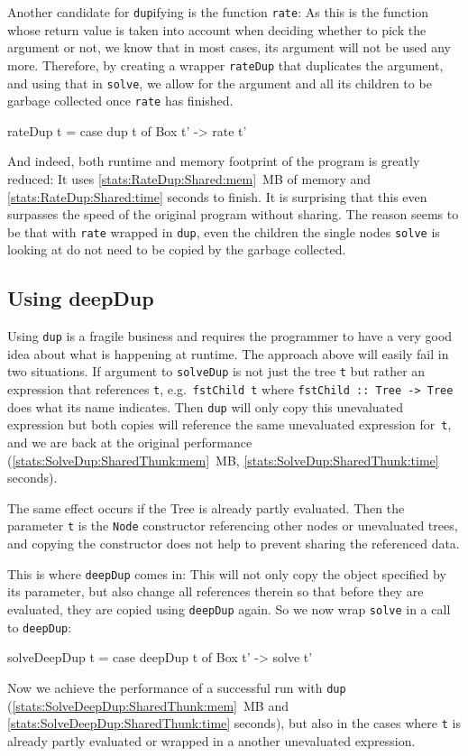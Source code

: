 \documentclass[preprint]{sigplanconf}
\theoremstyle{nonumberplain}
\newcommand{\li}{\lstinline[style=Haskell]}
\begin{document}
Another candidate for \li-dup-ifying is the function \li-rate-:
As this is the function whose return value is taken into account when deciding whether to pick the argument or not, we know that in most cases, its argument will not be used any more. Therefore, by creating a wrapper \li-rateDup- that duplicates the argument, and using that in \li-solve-, we allow for the argument and all its children to be garbage collected once \li-rate- has finished.

\begin{haskell}
rateDup t = case dup t of Box t' -> rate t'
\end{haskell}
And indeed, both runtime and memory footprint of the program is greatly reduced: It uses \ref{stats:RateDup:Shared:mem}~MB of memory and \ref{stats:RateDup:Shared:time} seconds to finish. It is surprising that this even surpasses the speed of the original program without sharing. The reason seems to be  that with \li-rate- wrapped in \li-dup-, even the children the single nodes \li-solve- is looking at do not need to be copied by the garbage collected.

\subsection{Using deepDup}

\label{sec:deepdup}
Using \li-dup- is a fragile business and requires the programmer to have a very good idea about what is happening at runtime. The approach above will easily fail in two situations. If argument to \li-solveDup- is not just the tree \li-t- but rather an expression that references \li-t-, e.g.\ \li-fstChild t- where \li!fstChild :: Tree -> Tree! does what its name indicates. Then \li-dup- will only copy this unevaluated expression but both copies will reference the same unevaluated expression for~\li-t-, and we are back at the original performance (\ref{stats:SolveDup:SharedThunk:mem}~MB, \ref{stats:SolveDup:SharedThunk:time} seconds).

The same effect occurs if the Tree is already partly evaluated. Then the parameter \li-t- is the \li-Node- constructor referencing other nodes or unevaluated trees, and copying the constructor does not help to prevent sharing the referenced data.

This is where \li-deepDup- comes in: This will not only copy the object specified by its parameter, but also change all references therein so that before they are evaluated, they are copied using \li-deepDup- again. So we now wrap \li-solve- in a call to \li-deepDup-:
\begin{haskell}
solveDeepDup t = case deepDup t of Box t' -> solve t'
\end{haskell}
Now we achieve the performance of a successful run with \li-dup- (\ref{stats:SolveDeepDup:SharedThunk:mem}~MB and \ref{stats:SolveDeepDup:SharedThunk:time} seconds), but also in the cases where \li-t- is already partly evaluated or wrapped in a another unevaluated expression.
\end{document}
